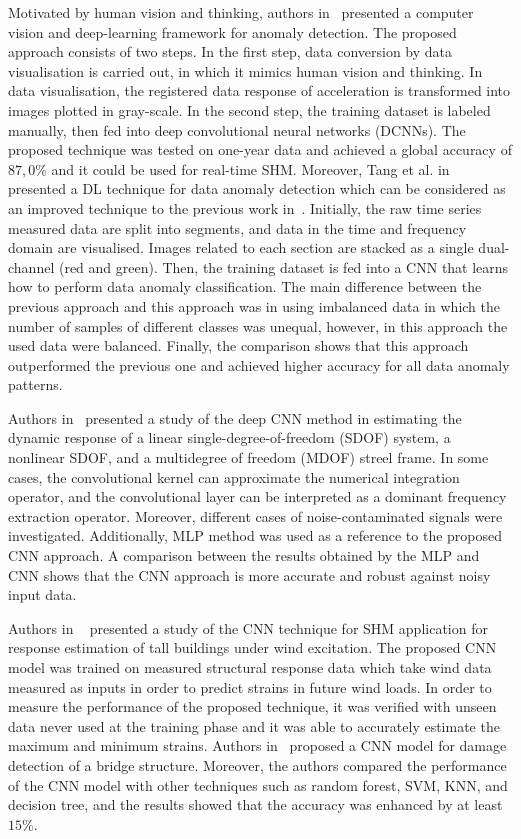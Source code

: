Motivated by human vision and thinking, authors in~\cite{Cha2018} presented a computer vision and deep-learning framework for anomaly detection.
The proposed approach consists of two steps.
In the first step, data conversion by data visualisation is carried out, in which it mimics human vision and thinking.
In data visualisation,  the registered data response of acceleration is transformed into images plotted in gray-scale. 
In the second step, the training dataset is labeled manually, then fed into deep convolutional neural networks (DCNNs).
The proposed technique was tested on one-year data and achieved a global accuracy of \(87,0\%\) and it could be used for real-time SHM.
Moreover, Tang et al. in~\cite{Tang2019} presented a DL technique for data anomaly detection which can be considered as an improved technique to the previous work in~\cite{Cha2018}.
Initially, the raw time series measured data are split into segments, and data in the time and frequency domain are visualised. 
Images related to each section are stacked as a single dual-channel (red and green).
Then, the training dataset is fed into a CNN that learns how to perform data anomaly classification.
The main difference between the previous approach and this approach was in using imbalanced data in which the number of samples of different classes was unequal, however, in this approach the used data were balanced.
Finally, the comparison shows that this approach outperformed the previous one and achieved higher accuracy for all data anomaly patterns.

Authors in~\cite{Wu2019} presented a study of the deep CNN method in estimating the dynamic response of a linear single-degree-of-freedom (SDOF) system, a nonlinear SDOF, and a multidegree of freedom (MDOF) streel frame.
In some cases, the convolutional kernel can approximate the numerical integration operator, and the convolutional layer can be interpreted as a dominant frequency extraction operator.
Moreover, different cases of noise-contaminated signals were investigated. 
Additionally, MLP method was used as a reference to the proposed CNN approach.
A comparison between the results obtained by the MLP and CNN shows that the CNN approach is more accurate and robust against noisy input data.

Authors in ~\cite{Oh2019}  presented a study of the CNN technique for SHM application for response estimation of tall buildings under wind excitation.
The proposed CNN model was trained on measured structural response data which take wind data measured as inputs in order to predict strains in future wind loads.
In order to measure the performance of the proposed technique, it was verified with unseen data never used at the training phase and it was able to accurately estimate the maximum and minimum strains.
Authors in~\cite{Li2020} proposed a CNN model for damage detection of a bridge structure.
Moreover, the authors compared the performance of the CNN model with other techniques such as random forest, SVM, KNN, and decision tree, and the results showed that the accuracy was enhanced by at least \(15\%\).

